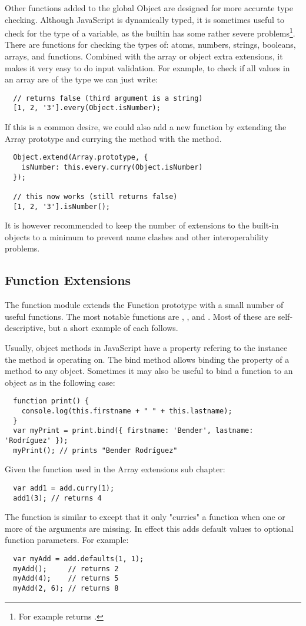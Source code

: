 Other functions added to the global Object are designed for more accurate type checking. Although JavaScript is dynamically typed, it is sometimes useful to check for the type of a variable, as the builtin  has some rather severe problems\footnote{For example  returns .}. There are functions for checking the types of: atoms, numbers, strings, booleans, arrays, and functions. Combined with the array or object extra extensions, it makes it very easy to do input validation. For example, to check if all values in an array are of the type  we can just write:
\begin{verbatim}
  // returns false (third argument is a string)
  [1, 2, '3'].every(Object.isNumber);
\end{verbatim}
If this is a common desire, we could also add a new function by extending the Array prototype and currying the  method with the  method.
\begin{verbatim}
  Object.extend(Array.prototype, {
    isNumber: this.every.curry(Object.isNumber)
  });

  // this now works (still returns false)
  [1, 2, '3'].isNumber();
\end{verbatim}
It is however recommended to keep the number of extensions to the built-in objects to a minimum to prevent name clashes and other interoperability problems.

\subsection{Function Extensions}
The function module extends the Function prototype with a small number of useful functions. The most notable functions are , , and . Most of these are self-descriptive, but a short example of each follows.

Usually, object methods in JavaScript have a  property refering to the instance the method is operating on. The bind method allows binding the  property of a method to any object. Sometimes it may also be useful to bind a function to an object as in the following case:
\begin{verbatim}
  function print() {
    console.log(this.firstname + " " + this.lastname);
  }
  var myPrint = print.bind({ firstname: 'Bender', lastname: 'Rodríguez' });
  myPrint(); // prints "Bender Rodríguez"
\end{verbatim}
Given the  function used in the Array extensions sub chapter:
\begin{verbatim}
  var add1 = add.curry(1);
  add1(3); // returns 4
\end{verbatim}
The  function is similar to  except that it only "curries" a function when one or more of the arguments are missing. In effect this adds default values to optional function parameters. For example:
\begin{verbatim}
  var myAdd = add.defaults(1, 1);
  myAdd();     // returns 2
  myAdd(4);    // returns 5
  myAdd(2, 6); // returns 8
\end{verbatim}
